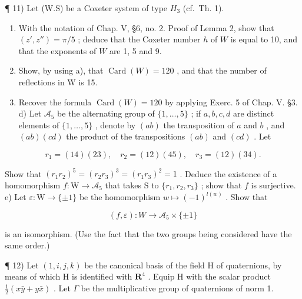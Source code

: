 ¶ 11) Let (W.S) be a Coxeter system of type \(H_{3}\) (cf.~Th. 1).

\begin{enumerate}
\def\labelenumi{\alph{enumi})}
\item
  With the notation of Chap. V, §6, no. 2. Proof of Lemma 2, show that \((z', z'') = \pi/5\) ; deduce that the Coxeter number \(h\) of \(W\) is equal to 10, and that the exponents of \(W\) are 1, 5 and 9.
\item
  Show, by using a), that \(\operatorname{Card}(W) = 120\) , and that the number of reflections in W is 15.
\item
  Recover the formula \(\operatorname{Card}(W) = 120\) by applying Exerc. 5 of Chap. V. §3. d) Let \(\mathcal{A}_5\) be the alternating group of \(\{1, \ldots, 5\}\) ; if \(a, b, c, d\) are distinct elements of \(\{1, \ldots, 5\}\) , denote by \((ab)\) the transposition of \(a\) and \(b\) , and \((ab)(cd)\) the product of the transpositions \((ab)\) and \((cd)\) . Let
\end{enumerate}

\[
r _ {1} = (14) (23), \quad r _ {2} = (12) (45), \quad r _ {3} = (12) (34).
\]

Show that \((r_1r_2)^5 = (r_2r_3)^3 = (r_1r_3)^2 = 1\) . Deduce the existence of a homomorphism \(f: \mathrm{W} \to \mathcal{A}_5\) that takes S to \(\{r_1, r_2, r_3\}\) ; show that \(f\) is surjective.\\
e) Let \(\varepsilon: \mathrm{W} \to \{\pm 1\}\) be the homomorphism \(w \mapsto (-1)^{l(w)}\) . Show that

\[
(f, \varepsilon): W \rightarrow \mathcal {A} _ {5} \times \{\pm 1 \}
\]

is an isomorphism. (Use the fact that the two groups being considered have the same order.)

¶ 12) Let \((1, i, j, k)\) be the canonical basis of the field H of quaternions, by means of which H is identified with \(\mathbf{R}^4\) . Equip H with the scalar product \(\frac{1}{2}(x\bar{y} + y\bar{x})\) . Let \(\Gamma\) be the multiplicative group of quaternions of norm 1.

